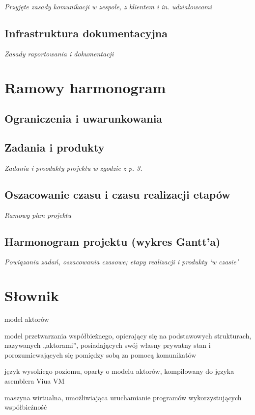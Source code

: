 \documentclass[11pt,oneside,a4paper,titlepage,onecolumn]{article}
\begin{document}
\emph{Przyjęte zasady komunikacji w zespole, z klientem i in. udziałowcami}

\subsection{Infrastruktura dokumentacyjna}

\emph{Zasady raportowania i dokumentacji}

\section{Ramowy harmonogram}

\subsection{Ograniczenia i uwarunkowania}

\subsection{Zadania i produkty}

\emph{Zadania i proodukty projektu w zgodzie z p. 3.}

\subsection{Oszacowanie czasu i czasu realizacji etapów}

\emph{Ramowy plan projektu}

\subsection{Harmonogram projektu (wykres Gantt’a)}

\emph{Powiązania zadań, oszacowania czasowe; etapy realizacji i produkty ‘w czasie’}

\section{Słownik}

\begin{labeling}{model aktorów}
    \item [model aktorów] model przetwarzania współbieżnego, opierający się na podstawowych strukturach, nazywanych „aktorami”, posiadających swój własny prywatny stan i porozumiewających się pomiędzy sobą za pomocą komunikatów
    \item [ViuAct] język wysokiego poziomu, oparty o modelu aktorów, kompilowany do języka asemblera Viua VM
    \item [Viua VM] maszyna wirtualna, umożliwiająca uruchamianie programów wykorzystujących współbieżność
\end{labeling}
\end{document}
